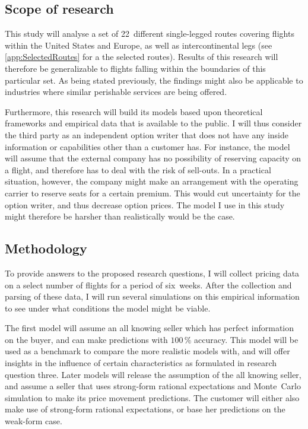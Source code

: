 \subsection{Scope of research}
This study will analyse a set of 22~different single-legged routes covering flights within the United States and Europe, as well as intercontinental legs (see \autoref{app:SelectedRoutes} for a the selected routes). Results of this research will therefore be generalizable to flights falling within the boundaries of this particular set. As being stated previously, the findings might also be applicable to industries where similar perishable services are being offered.

Furthermore, this research will build its models based upon theoretical frameworks and empirical data that is available to the public. I will thus consider the third party as an independent option writer that does not have any inside information or capabilities other than a customer has. For instance, the model will assume that the external company has no possibility of reserving capacity on a flight, and therefore has to deal with the risk of sell-outs. In a practical situation, however, the company might make an arrangement with the operating carrier to reserve seats for a certain premium. This would cut uncertainty for the option writer, and thus decrease option prices. The model I use in this study might therefore be harsher than realistically would be the case.


\subsection{Methodology}
To provide answers to the proposed research questions, I will collect pricing data on a select number of flights for a period of six~weeks. After the collection and parsing of these data, I will run several simulations on this empirical information to see under what conditions the model might be viable.

The first model will assume an all knowing seller which has perfect information on the buyer, and can make predictions with $100\,\%$ accuracy. This model will be used as a benchmark to compare the more realistic models with, and will offer insights in the influence of certain characteristics as formulated in research question three. Later models will release the assumption of the all knowing seller, and assume a seller that uses strong-form rational expectations and Monte~Carlo simulation to make its price movement predictions. The customer will either also make use of strong-form rational expectations, or base her predictions on the weak-form case.


